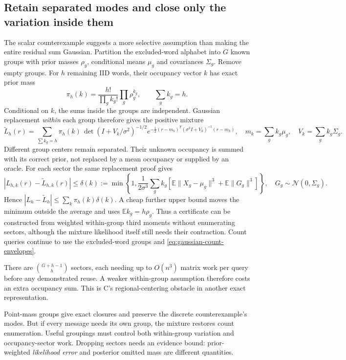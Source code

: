 \documentclass[10pt,a4paper]{article}
\newcommand{\E}{\mathbb E}
\begin{document}
\subsection{Retain separated modes and close only the variation inside them}
The scalar counterexample suggests a more selective assumption than making the entire residual sum Gaussian.
Partition the excluded-word alphabet into $G$ known groups with prior masses $\rho_g$, conditional means
$\mu_g$ and covariances $\Sigma_g$. Remove empty groups. For $h$ remaining IID words, their occupancy
vector $k$ has exact prior mass
\[
 \pi_h(k)=\frac{h!}{\prod_g k_g!}\prod_g\rho_g^{k_g},\qquad \sum_gk_g=h.
\]
Conditional on $k$, the sums inside the groups are independent. Gaussian replacement \emph{within} each
group therefore gives the positive mixture
\begin{equation}
 \widetilde L_h(r)=\sum_{\sum k_g=h}\pi_h(k)\,
 \det(I+V_k/\sigma^2)^{-1/2}
 e^{-\frac12(r-m_k)^T(\sigma^2I+V_k)^{-1}(r-m_k)},
 \quad m_k=\sum_gk_g\mu_g,\quad V_k=\sum_gk_g\Sigma_g.
 \label{eq:mixture-residual}
\end{equation}
Different group centers remain separated. Their unknown occupancy is summed with its correct prior,
not replaced by a mean occupancy or supplied by an oracle. For each sector the same replacement proof gives
\[
 |L_{h,k}(r)-\widetilde L_{h,k}(r)|
 \leq\delta(k):=\min\!\left\{1,\frac1{2\sigma^3}
       \sum_g k_g[\E\|X_g-\mu_g\|^3+\E\|G_g\|^3]\right\},
 \quad G_g\sim\mathcal N(0,\Sigma_g).
\]
Hence $|L_h-\widetilde L_h|\leq\sum_k\pi_h(k)\delta(k)$. A cheap further upper bound moves the minimum
outside the average and uses $\E k_g=h\rho_g$. Thus a certificate can be constructed from weighted
within-group third moments without enumerating sectors, although the mixture likelihood itself still
needs their contraction. Count queries continue to use the excluded-word groups and
\eqref{eq:gaussian-count-envelopes}.

There are $\binom{G+h-1}{h}$ sectors, each needing up to $O(n^3)$ matrix work per query before any
demonstrated reuse. A weaker within-group assumption therefore costs an extra occupancy sum.
This is C's regional-centering obstacle in another exact representation.

Point-mass groups give exact closures and preserve the discrete counterexample's modes. But if every
message needs its own group, the mixture restores count enumeration. Useful groupings must control both
within-group variation and occupancy-sector work. Dropping sectors needs an evidence bound:
prior-weighted \emph{likelihood error} and posterior omitted mass are different quantities.
\end{document}
